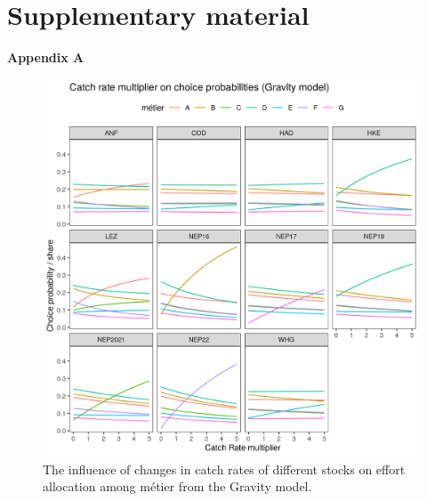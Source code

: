 \documentclass[12pt, halfline, a4paper]{ouparticle}
\begin{document}
\clearpage

\section{Supplementary material}
\setcounter{figure}{0} \renewcommand{\thefigure}{A.\arabic{figure}}
\makeatletter
\renewcommand{\thefigure}{S\@arabic\c@figure} 
\makeatletter
\textbf{Appendix A}

\begin{figure}[!ht]
	\centering
	\includegraphics[width=1\linewidth]{figures/Gravity_Metier_Catch_Rate_Multiplier}
	\caption{The influence of changes in catch rates of different stocks on
	effort allocation among métier from the Gravity model.} 
	\label{fig:Grav_CR}
\end{figure}	
\end{document}
